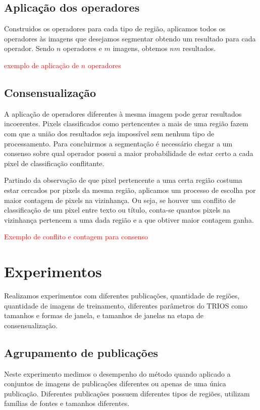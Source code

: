 \documentclass[a4paper,11pt]{article}
\newcommand{\TODO}[1]{\textcolor{red}{#1}}
\begin{document}
    \subsection{Aplicação dos operadores}

      Construidos os operadores para cada tipo de região, aplicamos todos os operadores às imagens que desejamos segmentar obtendo um resultado para cada operador. Sendo $n$ operadores e $m$ imagens, obtemos $nm$ resultados.

      \TODO{exemplo de aplicação de $n$ operadores}

    \subsection{Consensualização}

      A aplicação de operadores diferentes à mesma imagem pode gerar resultados incoerentes. Pixels classificados como pertencentes a mais de uma região fazem com que a união dos resultados seja impossível sem nenhum tipo de processamento. Para concluirmos a segmentação é necessário chegar a um consenso sobre qual operador possui a maior probabilidade de estar certo a cada pixel de classificação conflitante.

      Partindo da observação de que pixel pertencente a uma certa região costuma estar cercados por pixels da mesma região, aplicamos um processo de escolha por maior contagem de pixels na vizinhança. Ou seja, se houver um conflito de classificação de um pixel entre texto ou título, conta-se quantos pixels na vizinhança pertencem a uma dada região e a que obtiver maior contagem ganha.

      \TODO{Exemplo de conflito e contagem para consenso}

\section{Experimentos}

  Realizamos experimentos com diferentes publicações, quantidade de regiões, quantidade de imagens de treinamento, diferentes parâmetros do TRIOS como tamanhos e formas de janela, e tamanhos de janelas na etapa de consensualização.

  \subsection{Agrupamento de publicações}

    Neste experimento medimos o desempenho do método quando aplicado a conjuntos de imagens de publicações diferentes ou apenas de uma única publicação. Diferentes publicações possuem diferentes tipos de regiões, utilizam famílias de fontes e tamanhos diferentes.
\end{document}
